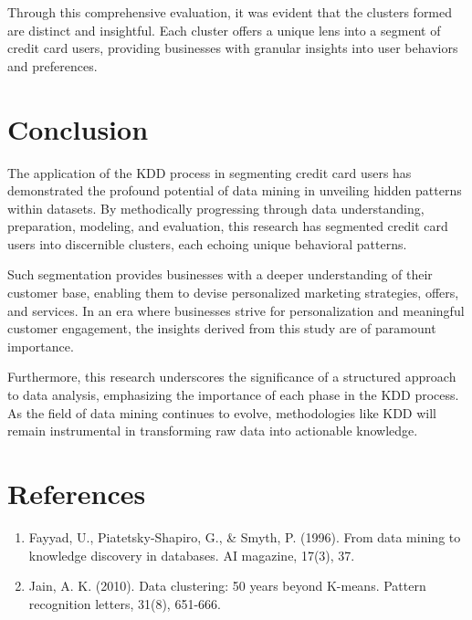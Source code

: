 \documentclass[12pt]{article}
\begin{document}
Through this comprehensive evaluation, it was evident that the clusters formed are distinct and insightful. Each cluster offers a unique lens into a segment of credit card users, providing businesses with granular insights into user behaviors and preferences.


\section{Conclusion}

The application of the KDD process in segmenting credit card users has demonstrated the profound potential of data mining in unveiling hidden patterns within datasets. By methodically progressing through data understanding, preparation, modeling, and evaluation, this research has segmented credit card users into discernible clusters, each echoing unique behavioral patterns. 

Such segmentation provides businesses with a deeper understanding of their customer base, enabling them to devise personalized marketing strategies, offers, and services. In an era where businesses strive for personalization and meaningful customer engagement, the insights derived from this study are of paramount importance.

Furthermore, this research underscores the significance of a structured approach to data analysis, emphasizing the importance of each phase in the KDD process. As the field of data mining continues to evolve, methodologies like KDD will remain instrumental in transforming raw data into actionable knowledge.

\section{References}

\begin{enumerate}
\item Fayyad, U., Piatetsky-Shapiro, G., & Smyth, P. (1996). From data mining to knowledge discovery in databases. AI magazine, 17(3), 37.
\item Jain, A. K. (2010). Data clustering: 50 years beyond K-means. Pattern recognition letters, 31(8), 651-666.
\end{enumerate}
\end{document}
